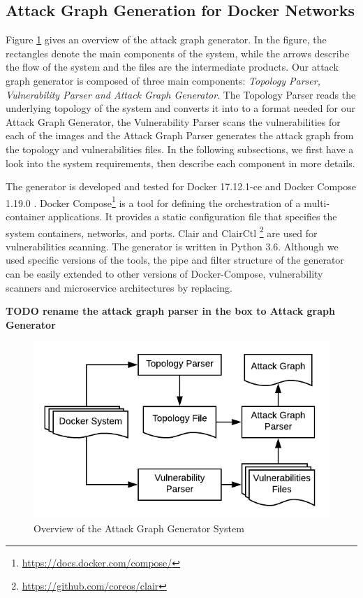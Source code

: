 \subsection{Attack Graph Generation for Docker Networks}
\label{chap:technical}

 Figure \ref{AttackGraphSystem} gives an overview of the attack graph generator. In the figure, the rectangles denote the main components of the system, while the arrows describe the flow of the system and the files are the intermediate products. Our attack graph generator is composed of three main components: \textit{Topology Parser, Vulnerability Parser and Attack Graph Generator}. The Topology Parser reads the underlying topology of the system and converts it into to a format needed for our Attack Graph Generator, the Vulnerability Parser scans the vulnerabilities for each of the images and the Attack Graph Parser generates the attack graph from the topology and vulnerabilities files. In the following subsections, we first have a look into the system requirements, then describe each component in more details.

The generator is developed and tested for Docker 17.12.1-ce and Docker Compose 1.19.0 \cite{merkel2014docker}. Docker Compose\footnote{\url{https://docs.docker.com/compose/}} is a tool for defining the orchestration of a multi-container applications. It provides a static configuration file that specifies the system containers, networks, and ports. Clair and ClairCtl \footnote{\url{https://github.com/coreos/clair}}  are used for vulnerabilities scanning. The generator is written in Python 3.6. Although we used  specific versions of the tools, the pipe and filter structure of the generator can be easily extended to other versions of Docker-Compose, vulnerability scanners and microservice architectures by replacing.


\textbf{TODO rename the attack graph parser in the box to Attack graph Generator}
\begin{figure}
	\includegraphics[scale=0.9]{./images/AttackGraphSystem}
	\caption{Overview of the Attack Graph Generator System}
	\label{AttackGraphSystem}
\end{figure}

